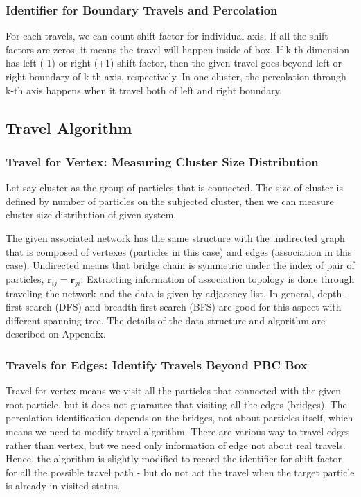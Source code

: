 \documentclass[11pt]{article}
\begin{document}
\subsubsection{Identifier for Boundary Travels and Percolation}
\label{sec:orgheadline5}
For each travels, we can count shift factor for individual axis. If all the shift factors are zeros, it means the travel will happen inside of box. If k-th dimension has left (-1) or right (+1) shift factor, then the given travel goes beyond left or right boundary of k-th axis, respectively. In one cluster, the percolation through k-th axis happens when it travel both of left and right boundary.

\subsection{Travel Algorithm}
\label{sec:orgheadline11}
\subsubsection{Travel for Vertex: Measuring Cluster Size Distribution}
\label{sec:orgheadline7}
Let say cluster as the group of particles that is connected. The size of cluster is defined by number of particles on the subjected cluster, then we can measure cluster size distribution of given system. 

The given associated network has the same structure with the undirected graph that is composed of vertexes (particles in this case) and edges (association in this case). Undirected means that bridge chain is symmetric under the index of pair of particles, \(\mathbf{r}_{ij} = \mathbf{r}_{ji}\). Extracting information of association topology is done through traveling the network and the data is given by adjacency list. In general, depth-first search (DFS) and breadth-first search (BFS) are good for this aspect with different spanning tree. The details of the data structure and algorithm are described on Appendix. 



\subsubsection{Travels for Edges: Identify Travels Beyond PBC Box}
\label{sec:orgheadline8}
Travel for vertex means we visit all the particles that connected with the given root particle, but it does not guarantee that visiting all the edges (bridges). The percolation identification depends on the bridges, not about particles itself, which means we need to modify travel algorithm. There are various way to travel edges rather than vertex, but we need only information of edge not about real travels. Hence, the algorithm is slightly modified to record the identifier for shift factor for all the possible travel path - but do not act the travel when the target particle is already in-visited status. 
\end{document}
